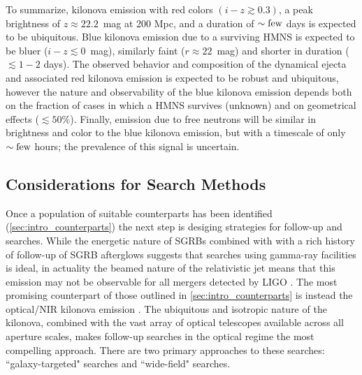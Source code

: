 To summarize, kilonova emission with red colors $(i-z\gtrsim 0.3)$, a peak brightness of $z\approx22.2$~mag at 200 Mpc, and a duration of $\sim \rm few$ days is expected to be ubiquitous. Blue kilonova emission due to a surviving HMNS is expected to be bluer ($i-z \lesssim 0$~mag), similarly faint ($r \approx 22$~mag) and shorter in duration ($\lesssim 1-2$ days). The observed behavior and composition of the dynamical ejecta and associated red kilonova emission is expected to be robust and ubiquitous, however the nature and observability of the blue kilonova emission depends both on the fraction of cases in which a HMNS survives (unknown) and on geometrical effects ($\lesssim 50\%$).  Finally, emission due to free neutrons will be similar in brightness and color to the blue kilonova emission, but with a timescale of only $\sim \rm few$ hours; the prevalence of this signal is uncertain.

\subsection{Considerations for Search Methods}
\label{sec:intro_searchmethods}
Once a population of suitable counterparts has been identified (\cref{sec:intro_counterparts}) the next step is desiging strategies for follow-up and searches. While the energetic nature of SGRBs combined with with a rich history of follow-up of SGRB afterglows \citep[see e.g.,][for a review]{Berger2014} suggests that searches using gamma-ray facilities is ideal, in actuality the beamed nature of the relativistic jet means that this emission may not be observable for all mergers detected by LIGO \citep{ChenHolz13}. The most promising counterpart of those outlined in \cref{sec:intro_counterparts} is instead the optical/NIR kilonova emission \citep{MetzgerBerger12}. The ubiquitous and isotropic nature of the kilonova, combined with the vast array of optical telescopes available across all aperture scales, makes follow-up searches in the optical regime the most compelling approach. There are two primary approaches to these searches: ``galaxy-targeted" searches and ``wide-field" searches.

